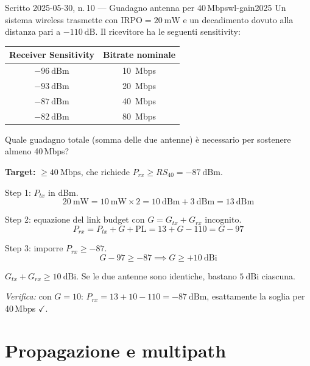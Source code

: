\documentclass{report}
\begin{document}
\begin{Exercise}{Scritto 2025-05-30, n.\,10 --- Guadagno antenna per 40\,Mbps}{wl-gain2025}
Un sistema wireless trasmette con $\text{IRPO}=20\ \text{mW}$ e un decadimento
dovuto alla distanza pari a $-110\ \text{dB}$. Il ricevitore ha le seguenti
sensitivity:
\begin{center}
\begin{tabular}{cc}
\hline
Receiver Sensitivity & Bitrate nominale \\
\hline
$-96\ \text{dBm}$ & 10~Mbps \\
$-93\ \text{dBm}$ & 20~Mbps \\
$-87\ \text{dBm}$ & 40~Mbps \\
$-82\ \text{dBm}$ & 80~Mbps \\
\hline
\end{tabular}
\end{center}
Quale guadagno totale (somma delle due antenne) è necessario per sostenere
almeno 40\,Mbps?
\end{Exercise}

\begin{solution}
\textbf{Target:} $\geq 40\ \text{Mbps}$, che richiede $P_{rx} \geq RS_{40} = -87\ \text{dBm}$.

Step 1: $P_{tx}$ in dBm.
\[
  20\ \text{mW} = 10\ \text{mW} \times 2 = 10\ \text{dBm} + 3\ \text{dBm} = 13\ \text{dBm}
\]

Step 2: equazione del link budget con $G = G_{tx}+G_{rx}$ incognito.
\[
  P_{rx} = P_{tx} + G + \text{PL} = 13 + G - 110 = G - 97
\]

Step 3: imporre $P_{rx} \geq -87$.
\[
  G - 97 \geq -87 \implies G \geq +10\ \text{dBi}
\]

$\boxed{G_{tx}+G_{rx} \geq 10\ \text{dBi}}$. Se le due antenne sono identiche,
bastano $5\ \text{dBi}$ ciascuna.

\medskip
\emph{Verifica:} con $G=10$: $P_{rx} = 13 + 10 - 110 = -87\ \text{dBm}$,
esattamente la soglia per 40\,Mbps $\checkmark$.
\end{solution}

\section{Propagazione e multipath}
\end{document}
